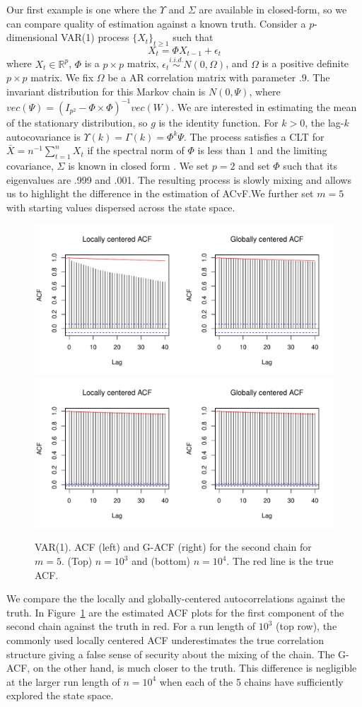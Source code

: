 \documentclass[11pt]{article}
\theoremstyle{remark}
\begin{document}
 
Our first example is one where the $\Upsilon$ and $\Sigma$ are available in closed-form, so we can compare quality of estimation against a known truth. Consider a $p$-dimensional VAR(1) process $\{X_t\}_{t \geq 1}$ such that
%
\[
X_t = \Phi X_{t-1} + \epsilon_t
\]
%
where $X_t \in \mathbb{R}^p$, $\Phi $ is a $p \times p $ matrix, $ \epsilon_t \overset{i.i.d.}{\sim} N(0, \Omega)$, and $\Omega$ is a positive definite $p \times p$ matrix. We fix $\Omega$ be a AR correlation matrix with parameter .9. The invariant distribution for this Markov chain is $N(0, \Psi)$, where $vec(\Psi) = (I_{p^2} - \Phi \times \Phi)^{-1} vec(W)$. We are interested in estimating the mean of the stationary distribution, so $g$ is the identity function.  For $k > 0$, the lag-$k$ autocovariance is $\Upsilon(k) = \Gamma(k) = \Phi^k\Psi$. The process satisfies a CLT for $\bar{X} = n^{-1} \sum_{t=1}^{n} X_t$ if the spectral norm of $\Phi$ is less than 1 \citep{10.2307/1427459} and the limiting covariance, $\Sigma$ is known in closed form \citep{dai:jon:2017}. We set $p = 2$ and set $\Phi$ such that its eigenvalues are .999 and .001. The resulting process is slowly mixing and allows us to highlight the difference in the estimation of ACvF.We further set $m = 5$ with starting values dispersed across the state space.  
\begin{figure}[htbp]
\centering
   \includegraphics[width=.5\linewidth]{plots/var-acf_n1000.pdf}
     \includegraphics[width=.5\linewidth]{plots/var-acf_n10000.pdf} 
\caption{VAR(1). ACF (left) and G-ACF (right) for the second chain for $m = 5$. (Top) $n = 10^3$  and (bottom) $n =  10^4$. The red line is the true ACF.}
\label{fig:var-acf}
\end{figure}


We compare the the locally and globally-centered autocorrelations against the truth. In Figure~\ref{fig:var-acf} are the estimated ACF plots for the first component of the second chain against the truth in red. For a run length of $10^3$ (top row), the commonly used locally centered ACF underestimates the true correlation structure giving a false sense of security about the mixing of the chain. The G-ACF, on the other hand, is much closer to the truth. This difference is negligible at the larger run length of $n = 10^4$ when each of the 5 chains have sufficiently explored the state space.
\end{document}
